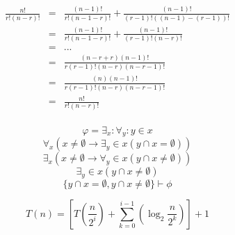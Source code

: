 \documentclass[a4paper,12pt]{article}
\begin{document}
\begin{eqnarray*}
\frac{n!}{r!(n-r)!}&=&\frac{(n-1)!}{r!(n-1-r)!}+\frac{(n-1)!}{(r-1)!((n-1)-(r-1))!}\\
&=&\frac{(n-1)!}{r!(n-1-r)!}+\frac{(n-1)!}{(r-1)!(n-r)!}\\
&=&...\\
&=&\frac{(n-r+r)(n-1)!}{r(r-1)!(n-r)(n-r-1)!}\\
&=&\frac{(n)(n-1)!}{r(r-1)!(n-r)(n-r-1)!}\\
&=&\frac{n!}{r!(n-r)!}\\
\end{eqnarray*}

\[\varphi=\exists_x:\forall_y:y\in x\]
\[\forall_x (x\neq\emptyset\to\exists_y\in x(y\cap x = \emptyset))\]
\[\exists_x (x\neq\emptyset\to\forall_y\in x(y\cap x \neq \emptyset))\]
\[\exists_y \in x(y\cap x \neq \emptyset)\]
\[\{y\cap x = \emptyset , y\cap x \neq \emptyset\} \vdash \phi\]

\[T(n) = \left[T\left(\frac{n}{2^i}\right)+\sum_{k=0}^{i-1} \left(\log_2\frac{n}{2^k}\right)\right]+1\]
\end{document}
